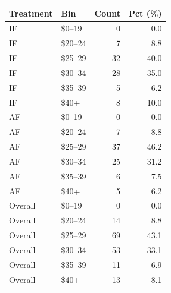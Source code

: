 \begin{tabular}{llrr}
  \toprule
  Treatment & Bin & Count & Pct (\%) \\ 
  \midrule
  IF & \$0--19 & 0 & 0.0 \\ 
  IF & \$20--24 & 7 & 8.8 \\ 
  IF & \$25--29 & 32 & 40.0 \\ 
  IF & \$30--34 & 28 & 35.0 \\ 
  IF & \$35--39 & 5 & 6.2 \\ 
  IF & \$40+ & 8 & 10.0 \\ 
  AF & \$0--19 & 0 & 0.0 \\ 
  AF & \$20--24 & 7 & 8.8 \\ 
  AF & \$25--29 & 37 & 46.2 \\ 
  AF & \$30--34 & 25 & 31.2 \\ 
  AF & \$35--39 & 6 & 7.5 \\ 
  AF & \$40+ & 5 & 6.2 \\ 
  Overall & \$0--19 & 0 & 0.0 \\ 
  Overall & \$20--24 & 14 & 8.8 \\ 
  Overall & \$25--29 & 69 & 43.1 \\ 
  Overall & \$30--34 & 53 & 33.1 \\ 
  Overall & \$35--39 & 11 & 6.9 \\ 
  Overall & \$40+ & 13 & 8.1 \\ 
  \bottomrule
\end{tabular}
